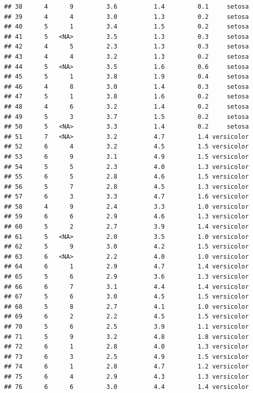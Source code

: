 \documentclass[]{book}
\theoremstyle{definition}
\theoremstyle{definition}
\theoremstyle{definition}
\theoremstyle{remark}
\begin{document}
\begin{verbatim}
## 38      4      9         3.6          1.4         0.1     setosa
## 39      4      4         3.0          1.3         0.2     setosa
## 40      5      1         3.4          1.5         0.2     setosa
## 41      5   <NA>         3.5          1.3         0.3     setosa
## 42      4      5         2.3          1.3         0.3     setosa
## 43      4      4         3.2          1.3         0.2     setosa
## 44      5   <NA>         3.5          1.6         0.6     setosa
## 45      5      1         3.8          1.9         0.4     setosa
## 46      4      8         3.0          1.4         0.3     setosa
## 47      5      1         3.8          1.6         0.2     setosa
## 48      4      6         3.2          1.4         0.2     setosa
## 49      5      3         3.7          1.5         0.2     setosa
## 50      5   <NA>         3.3          1.4         0.2     setosa
## 51      7   <NA>         3.2          4.7         1.4 versicolor
## 52      6      4         3.2          4.5         1.5 versicolor
## 53      6      9         3.1          4.9         1.5 versicolor
## 54      5      5         2.3          4.0         1.3 versicolor
## 55      6      5         2.8          4.6         1.5 versicolor
## 56      5      7         2.8          4.5         1.3 versicolor
## 57      6      3         3.3          4.7         1.6 versicolor
## 58      4      9         2.4          3.3         1.0 versicolor
## 59      6      6         2.9          4.6         1.3 versicolor
## 60      5      2         2.7          3.9         1.4 versicolor
## 61      5   <NA>         2.0          3.5         1.0 versicolor
## 62      5      9         3.0          4.2         1.5 versicolor
## 63      6   <NA>         2.2          4.0         1.0 versicolor
## 64      6      1         2.9          4.7         1.4 versicolor
## 65      5      6         2.9          3.6         1.3 versicolor
## 66      6      7         3.1          4.4         1.4 versicolor
## 67      5      6         3.0          4.5         1.5 versicolor
## 68      5      8         2.7          4.1         1.0 versicolor
## 69      6      2         2.2          4.5         1.5 versicolor
## 70      5      6         2.5          3.9         1.1 versicolor
## 71      5      9         3.2          4.8         1.8 versicolor
## 72      6      1         2.8          4.0         1.3 versicolor
## 73      6      3         2.5          4.9         1.5 versicolor
## 74      6      1         2.8          4.7         1.2 versicolor
## 75      6      4         2.9          4.3         1.3 versicolor
## 76      6      6         3.0          4.4         1.4 versicolor

\end{verbatim}
\end{document}
